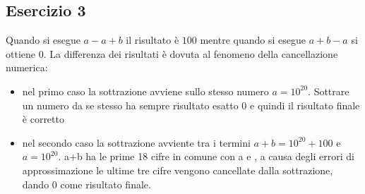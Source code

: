 \subsection{Esercizio 3}
Quando si esegue $a-a+b$ il risultato è $100$ mentre quando si esegue $a+b-a$ si ottiene $0$. La differenza dei risultati è dovuta al fenomeno della cancellazione
numerica:
\begin{itemize}
    \item nel primo caso la sottrazione avviene sullo stesso numero $a=10^{20}$. Sottrare un numero da se stesso ha sempre risultato esatto $0$ e quindi il risultato finale è corretto
    \item nel secondo caso la sottrazione avviente tra i termini $a+b = 10^{20} + 100$ e $a = 10^{20}$. a+b ha le prime 18 cifre in comune con a e , a causa degli errori di approssimazione le ultime tre cifre
    vengono cancellate dalla sottrazione, dando 0 come risultato finale.
\end{itemize}